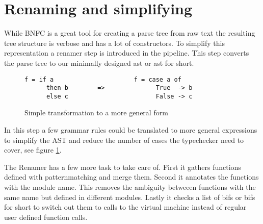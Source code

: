 \section{Renaming and simplifying}


While BNFC is a great tool for creating a parse tree from raw text the resulting tree structure is verbose and has a lot of constructors. To simplify this representation a renamer step is introduced in the pipeline. This step converts the parse tree to our minimally designed \acrlong{ast} or \acrshort{ast} for short. 

\begin{figure}
\begin{lstlisting} 
f = if a                      f = case a of
      then b        =>              True  -> b
      else c                        False -> c
\end{lstlisting}
\caption{Simple transformation to a more general form}
\label{lst:renamer1}
\end{figure}

In this step a few grammar rules could be translated to more general expressions to simplify the AST and reduce the number of cases the typechecker need to cover, see figure \ref{lst:renamer1}.

The Renamer has a few more task to take care of. First it gathers functions defined with patternmatching and merge them. Second it annotates the functions with the module name. This removes the ambiguity betweeen functions with the same name but defined in different modules. Lastly it checks a list of \acrlong{bif}s or \acrshort{bif}s for short to switch out them to calls to the virtual machine instead of regular user defined function calls.

